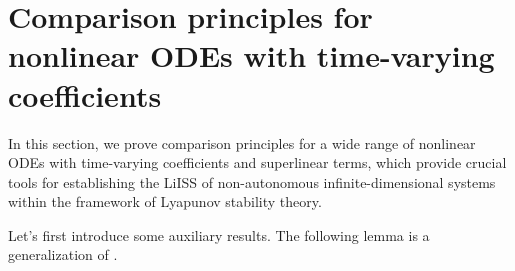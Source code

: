 \documentclass[onecolumn]{autart}
\newenvironment{proof of Prop.ODE}{{\it Proof of Proposition~\ref{Prop.ODE}:\enspace}}{\hfill $\blacksquare$\par}
\newenvironment{proof of PDE}{{\it Proof of Proposition \ref{Prop.8}:\enspace}}{\hfill $\blacksquare$\par}
\begin{document}
{%



\section{Comparison principles for nonlinear ODEs with time-varying coefficients}\label{comparison principle}

In this section, we prove comparison principles for a wide range of nonlinear ODEs with time-varying coefficients and superlinear terms, which provide crucial tools for establishing the LiISS of non-autonomous infinite-dimensional systems within the framework of Lyapunov stability theory.

Let's first introduce some auxiliary results. The following lemma is    a generalization of \cite[Lemma 4.4]{Lin1996a}.




}
\end{document}
